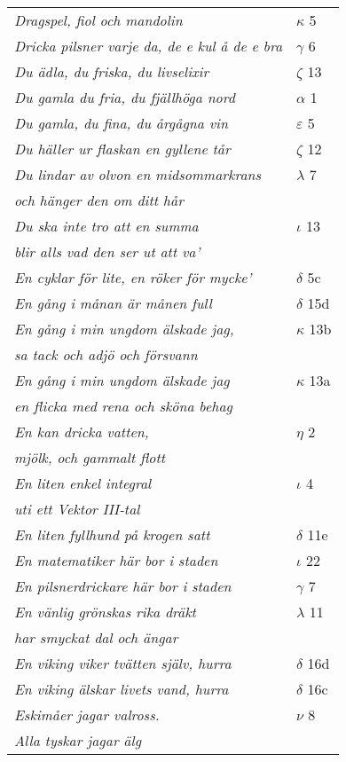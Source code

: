 \documentclass[a6paper,10pt]{article}
\begin{document}
\newpage
\begin{table}[!h]
\begin{tabular}{l l}
\textit{Dragspel, fiol och mandolin}	&$\kappa$ 5\\
\textit{Dricka pilsner varje da, de e kul å de e bra}	&$\gamma$ 6\\
\textit{Du ädla, du friska, du livselixir}	&$\zeta$ 13\\
\textit{Du gamla du fria, du fjällhöga nord}	&$\alpha$ 1\\
\textit{Du gamla, du fina, du årgågna vin}	&$\varepsilon$ 5\\
\textit{Du häller ur flaskan en gyllene tår}	&$\zeta$ 12\\
\textit{Du lindar av olvon en midsommarkrans}	&$\lambda$ 7\\
\textit{och hänger den om ditt hår} &\\
\textit{Du ska inte tro att en summa}	&$\iota$ 13\\
\textit{blir alls vad den ser ut att va'} &\\
\textit{En cyklar för lite, en röker för mycke'}	&$\delta$ 5c\\
\textit{En gång i månan är månen full}	&$\delta$ 15d\\
\textit{En gång i min ungdom älskade jag,}	&$\kappa$ 13b\\
\textit{sa tack och adjö och försvann} &\\
\textit{En gång i min ungdom älskade jag}	&$\kappa$ 13a\\
\textit{en flicka med rena och sköna behag} &\\
\textit{En kan dricka vatten,}	&$\eta$ 2\\
\textit{mjölk, och gammalt flott} &\\
\textit{En liten enkel integral}	&$\iota$ 4\\
\textit{uti ett Vektor III-tal} &\\
\textit{En liten fyllhund på krogen satt}	&$\delta$ 11e\\
\textit{En matematiker här bor i staden} &$\iota$ 22\\
\textit{En pilsnerdrickare här bor i staden}	&$\gamma$ 7\\
\textit{En vänlig grönskas rika dräkt}	&$\lambda$ 11\\
\textit{har smyckat dal och ängar} &\\
\textit{En viking viker tvätten själv, hurra} &$\delta$ 16d\\
\textit{En viking älskar livets vand, hurra}	&$\delta$ 16c\\
\textit{Eskimåer jagar valross.}	&$\nu$ 8\\
\textit{Alla tyskar jagar älg} &\\
\end{tabular}
\end{table}
\end{document}
